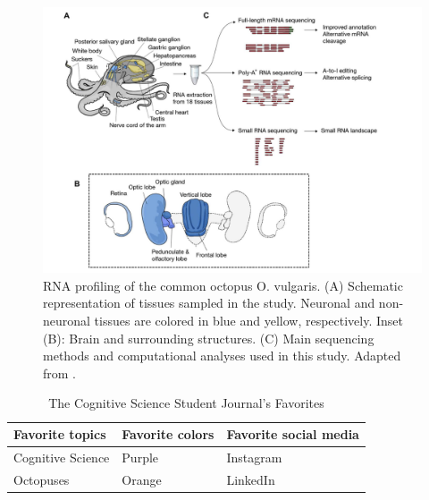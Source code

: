 \documentclass[11pt, twoside]{article}
\begin{document}
\begin{figure}
    \centering
    \includegraphics[width=0.8\linewidth]{images/example_image_2.png}
    \caption{RNA profiling of the common octopus O. vulgaris. (A) Schematic representation of tissues sampled in the study. Neuronal and non-neuronal tissues are colored in blue and yellow, respectively. Inset (B): Brain and surrounding structures. (C) Main sequencing methods and computational analyses used in this study. Adapted from \textcite{Zolotarov2022}.}
    \label{fig:example_graph}
\end{figure}

\begin{table}
    \centering
    \begin{tabular}{p{}p{}p{}}
    \hline
      Favorite topics & Favorite colors & Favorite social media\\
    \hline
      Cognitive Science & Purple & Instagram\\
      Octopuses & Orange & LinkedIn\\
    \hline
    \end{tabular}
    \caption{The Cognitive Science Student Journal's Favorites} 
    \label{tab:journal-introduction}
\end{table}





\newpage

\printbibliography[]{}
\end{document}
